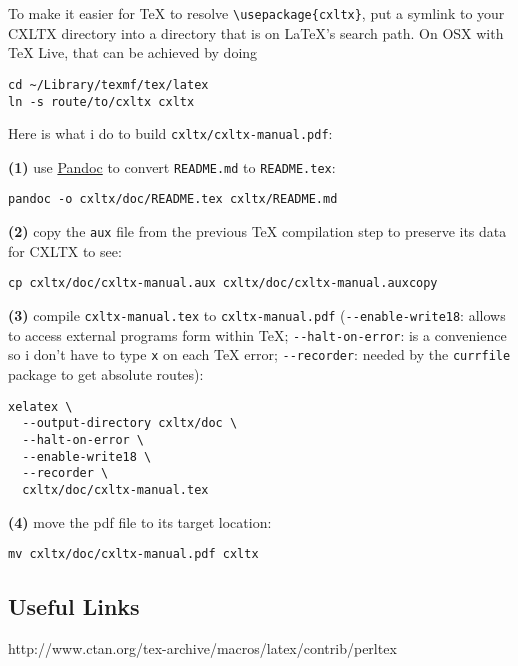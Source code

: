 To make it easier for TeX to resolve
\texttt{\textbackslash{}usepackage\{cxltx\}}, put a symlink to your
CXLTX directory into a directory that is on LaTeX's search path. On OSX
with TeX Live, that can be achieved by doing

\begin{verbatim}
cd ~/Library/texmf/tex/latex
ln -s route/to/cxltx cxltx
\end{verbatim}

Here is what i do to build \texttt{cxltx/cxltx-manual.pdf}:

\textbf{(1)} use \href{http://http://johnmacfarlane.net/pandoc}{Pandoc}
to convert \texttt{README.md} to \texttt{README.tex}:

\begin{verbatim}
pandoc -o cxltx/doc/README.tex cxltx/README.md
\end{verbatim}

\textbf{(2)} copy the \texttt{aux} file from the previous TeX
compilation step to preserve its data for CXLTX to see:

\begin{verbatim}
cp cxltx/doc/cxltx-manual.aux cxltx/doc/cxltx-manual.auxcopy
\end{verbatim}

\textbf{(3)} compile \texttt{cxltx-manual.tex} to
\texttt{cxltx-manual.pdf} (\texttt{-{}-enable-write18}: allows to access
external programs form within TeX; \texttt{-{}-halt-on-error}: is a
convenience so i don't have to type \texttt{x} on each TeX error;
\texttt{-{}-recorder}: needed by the \texttt{currfile} package to get
absolute routes):

\begin{verbatim}
xelatex \
  --output-directory cxltx/doc \
  --halt-on-error \
  --enable-write18 \
  --recorder \
  cxltx/doc/cxltx-manual.tex
\end{verbatim}

\textbf{(4)} move the pdf file to its target location:

\begin{verbatim}
mv cxltx/doc/cxltx-manual.pdf cxltx
\end{verbatim}

\subsection{Useful Links}\label{useful-links}

http://www.ctan.org/tex-archive/macros/latex/contrib/perltex

